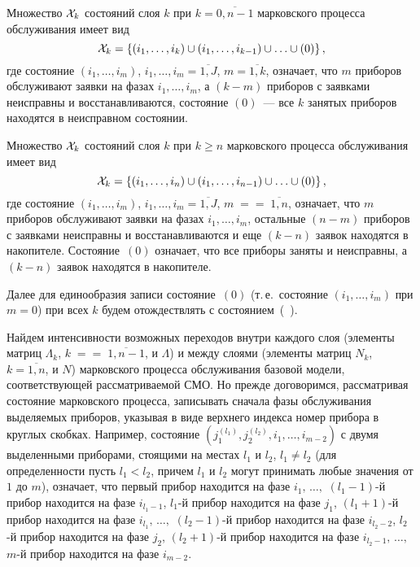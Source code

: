 \begin{multicols}{2}
Множество ${\cal X}_k$ состояний слоя $k$ при $k=\overline{0,n-1}$
марковского процесса обслуживания имеет вид
$$
{\cal X}_k
=
\{(i_1,\ldots,i_k)\cup (i_1,\ldots,i_{k-1})\cup\ldots\cup(0)\}\,,
$$
где состояние
$(i_1,\ldots,i_m)$,  $i_1,\ldots,i_m=\overline{1,J}$,\linebreak
$m=\overline{1,k}$,
означает, что $m$ приборов обслуживают заявки на фазах
$i_1,\ldots,i_m$, а $(k-m)$ приборов с заявками неисправны и
восстанавливаются, состояние $(0)$~--- все $k$ занятых приборов
находятся в неисправном состоянии.

Множество ${\cal X}_k$ состояний слоя $k$ при $k\ge n$ марковского
процесса обслуживания имеет вид
$$
{\cal X}_k
=
\{(i_1,\ldots,i_n)\cup (i_1,\ldots,i_{n-1})\cup\ldots\cup(0)\}\,,
$$
где состояние
$(i_1,\ldots,i_m)$, $i_1,\ldots,i_m=\overline{1,J}$, $m\;=$\linebreak $=\;\overline{1,n}$,
означает, что $m$ приборов обслуживают заявки на фазах
$i_1,\ldots,i_m$, остальные $(n-m)$ приборов с заявками неисправны
и восстанавливаются и еще $(k-n)$ заявок находятся в накопителе.
Состояние~$(0)$ означает, что все приборы заняты и неисправны, а
$(k-n)$ заявок находятся в накопителе.

Далее для единообразия записи состояние~$(0)$ (т.\,е.\ состояние
$(i_1,\ldots,i_m)$ при $m=0$) при всех $k$ будем отождествлять
с состоянием~(\ ).

Найдем интенсивности возможных переходов внутри каждого слоя
(элементы мат\-риц $\Lambda_k$, $k\;=$\linebreak $=\;\overline{1,n-1}$, и $\Lambda$)
и между слоями (элементы мат\-риц $N_k$,\ \ $k=\overline{1,n}$, и $N$)
марковского процесса обслуживания базовой модели, соответствующей
рас\-смат\-ри\-ва\-емой СМО.
Но прежде договоримся, рас\-смат\-ри\-вая состояние марковского процесса,
записывать сначала фазы обслуживания выделяемых приборов,
указывая в виде верхнего индекса номер прибора в круглых скобках.
Например, состояние $\left (j_1^{(l_1)},j_2^{(l_2)},i_1,\ldots,i_{m-2}\right )$
с двумя выделенными приборами, стоящими на местах
$l_1$ и $l_2$, $l_1\ne l_2$
(для определенности пусть $l_1 < l_2$, причем $l_1$ и $l_2$
могут принимать любые значения от $1$ до $m$), означает,
что первый прибор находится на фазе $i_1,\,\ldots,$
$(l_1\!-\!1)$-й прибор находится на фазе $i_{l_1-1}$,
$l_1$-й прибор находится на фазе $j_1$,
$(l_1+1)$-й прибор находится на фазе $i_{l_1},\,\ldots,$
$(l_2-1)$-й прибор находится на фазе $i_{l_2-2}$,
$l_2$-й прибор находится на фазе $j_2$,
$(l_2+1)$-й прибор находится на фазе $i_{l_2-1},\,\ldots,$
$m$-й прибор находится на фазе $i_{m-2}$.


\end{multicols}
